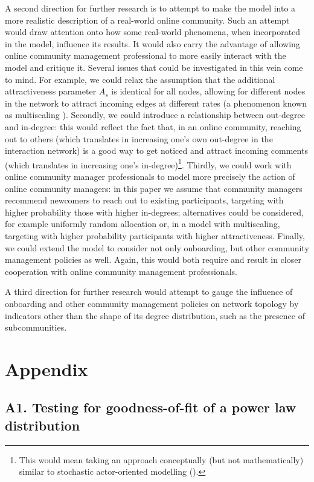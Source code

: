 \documentclass{article}
\begin{document}
A second direction for further research is to attempt to make the model into a more realistic description of a real-world online community. Such an attempt would draw attention onto how some real-world phenomena, when incorporated in the model, influence its results. It would also carry the advantage of allowing online community management professional to more easily interact with the model and critique it. Several issues that could be investigated in this vein come to mind. For example, we could relax the assumption that the additional attractiveness parameter $A_s$ is identical for all nodes, allowing for different nodes in the network to attract incoming edges at different rates (a phenomenon known as multiscaling \cite{bianconi2001competition}). Secondly, we could introduce a relationship between out-degree and in-degree: this would reflect the fact that, in an online community, reaching out to others (which translates in increasing one's own out-degree in the interaction network) is a good way to get noticed and attract incoming comments (which translates in increasing one's in-degree)\footnote{This would mean taking an approach conceptually (but not mathematically) similar to stochastic actor-oriented modelling (\cite{snijders1996stochastic}).}. Thirdly, we could work with online community manager professionals to model more precisely the action of online community managers: in this paper we assume that community managers recommend newcomers to reach out to existing participants, targeting with higher probability those with higher in-degrees; alternatives could be considered, for example uniformly random allocation or, in a model with multiscaling, targeting with higher probability participants with higher attractiveness. Finally, we could extend the model to consider not only onboarding, but other community management policies as well. Again, this would both require and result in closer cooperation with online community management professionals.

A third direction for further research would attempt to gauge the influence of onboarding and other community management policies on network topology by indicators other than the shape of its degree distribution, such as the presence of subcommunities. 



\section{Appendix}
\subsection{A1. Testing for goodness-of-fit of a power law distribution}
\end{document}
